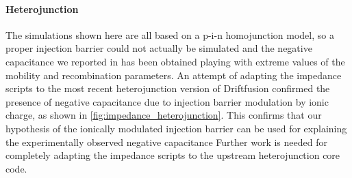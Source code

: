 \begin{figure}
\end{figure}

\paragraph{Heterojunction}
The simulations shown here are all based on a p-i-n homojunction model, so a proper injection barrier could not actually be simulated and the negative capacitance we reported in  has been obtained playing with extreme values of the mobility and recombination parameters.
An attempt of adapting the impedance scripts to the most recent heterojunction version of Driftfusion confirmed the presence of negative capacitance due to injection barrier modulation by ionic charge, as shown in \cref{fig:impedance_heterojunction}.
This confirms that our hypothesis of the ionically modulated injection barrier can be used for explaining the experimentally observed negative capacitance \cite{Guerrero2016,Moia2019,Ghahremanirad2017,Sanchez2014}
Further work is needed for completely adapting the impedance scripts to the upstream heterojunction core code.

